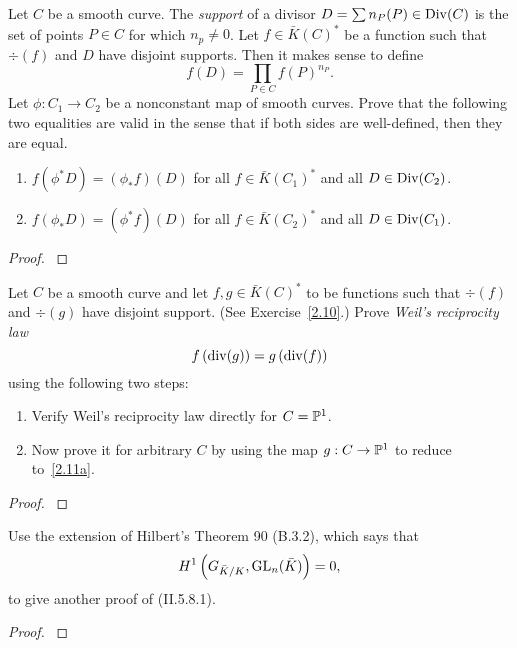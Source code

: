 \documentclass[12pt,reqno]{amsart}
\begin{document}
\begin{exe}\label{2.10}
Let $C$ be a smooth curve.  The \emph{support} of a divisor $D=\sum n_P(P)\in {\operatorname{Div}}(C)$ is the set of points $P\in C$ for which $n_p\neq 0$.  Let $f\in \bar{K}(C)^\ast$ be a function such that $\div(f)$ and $D$ have disjoint supports.  Then it makes sense to define
\[
f(D)=\prod_{P\in C}f(P)^{n_P}.
\]
Let $\phi: C_1 \to C_2$ be a nonconstant map of smooth curves.  Prove that the following two equalities are valid in the sense that if both sides are well-defined, then they are equal.
\begin{enumerate}
\item
$f(\phi^\ast D)=(\phi_\ast f)(D)$ for all $f\in \bar{K}(C_1)^\ast$ and all $D \in {\operatorname{Div}}(C_2)$.
\item
$f(\phi_\ast D)=(\phi^\ast f)(D)$ for all $f\in \bar{K}(C_2)^\ast$ and all $D \in {\operatorname{Div}}(C_1)$.
\end{enumerate}
\begin{proof}\label{s2.10}

\end{proof} 
\end{exe} 

\begin{exe}\label{2.11}
Let $C$ be a smooth curve and let $f, g \in \bar{K}(C)^\ast$ to be functions such that $\div (f)$ and $\div (g)$ have disjoint support.  (See Exercise~\ref{2.10}.)  Prove \emph{Weil's reciprocity law}
\[
f\left({\operatorname{div}}(g)\right)=g\left({\operatorname{div}}(f)\right)
\]
using the following two steps:
\begin{enumerate}
\item\label{2.11a}
Verify Weil's reciprocity law directly for $C={\mathbb P}^1$.
\item\label{2.11b}
Now prove it for arbitrary $C$ by using the map $g: C \to {\mathbb P}^1$ to reduce to~\ref{2.11a}.
\end{enumerate}
\begin{proof}\label{s2.11}

\end{proof} 
\end{exe} 

\begin{exe}\label{2.12}
Use the extension of Hilbert's Theorem 90 (B.3.2), which says that
\[
H^1\left(G_{\bar{K}/K}, {\operatorname{GL}}_n(\bar{K})\right)=0,
\]
to give another proof of (II.5.8.1).
\begin{proof}\label{s2.12}

\end{proof} 
\end{exe} 
\end{document}
